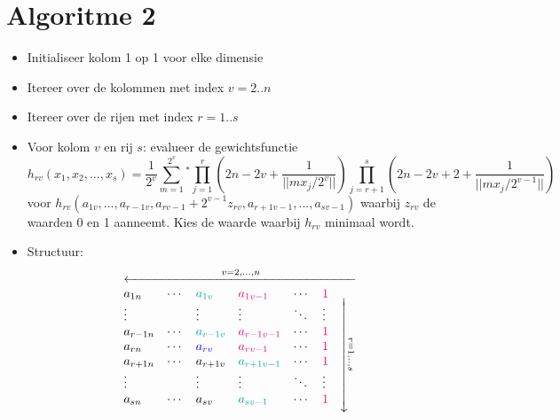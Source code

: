 \documentclass[a4paper, 12pt]{article}
\begin{document}
\section{Algoritme 2}
\begin{itemize}
\item Initialiseer kolom 1 op 1 voor elke dimensie
\item Itereer over de kolommen met index $v=2..n$ 
\item Itereer over de rijen met index $r = 1..s$
\item Voor kolom $v$ en rij $s$: evalueer de gewichtsfunctie 
\begin{equation}
h_{rv}(x_1,x_2,...,x_s)=\frac{1}{2^v}\sum_{m=1}^{2^v}{}^*\prod_{j=1}^r\left(2n-2v+\frac{1}{||mx_j/2^v||}\right)\prod_{j=r+1}^s\left(2n-2v+2+\frac{1}{||mx_j/2^{v-1}||}\right)
\end{equation}
voor $h_{rv}(a_{1v},...,a_{r-1v},a_{rv-1}+2^{v-1}z_{rv},a_{r+1v-1},...,a_{sv-1})$ waarbij $z_{rv}$ de waarden 0 en 1 aanneemt. Kies de waarde waarbij $h_{rv}$ minimaal wordt.
\item Structuur:
\begin{equation}
\begin{array}{lllllll}
\multicolumn{7}{c}{\xleftarrow{\mbox{\hspace{75pt}}v=2,...,n\mbox{\hspace{75pt}}}} \\
a_{1n} & \cdots & \mbox{\textcolor{Emerald}{$a_{1v}$}} & \mbox{\textcolor{RubineRed}{$a_{1v-1}$}} & \cdots & \mbox{\textcolor{RubineRed}{$1$}} & \multirow{7}{*}{\rotatebox{270}{$\xrightarrow{\mbox{\hspace{30pt}}r=1,..,s\mbox{\hspace{30pt}}}$}}\\
\vdots & & \vdots & \vdots & \ddots & \vdots & \\
a_{r-1n} & \cdots & \mbox{\textcolor{Emerald}{$a_{r-1v}$}} & \mbox{\textcolor{RubineRed}{$a_{r-1v-1}$}} & \cdots & 
\mbox{\textcolor{RubineRed}{$1$}} & \\
a_{rn} & \cdots & \mbox{\textcolor{Blue}{$a_{rv}$}} & \mbox{\textcolor{RubineRed}{$a_{rv-1}$}} & \cdots & 
\mbox{\textcolor{RubineRed}{$1$}} & \\
a_{r+1n} & \cdots & a_{r+1v} & \mbox{\textcolor{Emerald}{$a_{r+1v-1}$}} & \cdots & 
\mbox{\textcolor{RubineRed}{$1$}} & \\
\vdots & & \vdots & \vdots & \ddots & \vdots & \\
a_{sn} & \cdots & a_{sv}& \mbox{\textcolor{Emerald}{$a_{sv-1}$}} & \cdots &
\mbox{\textcolor{RubineRed}{$1$}} & \\
\end{array}
\end{equation}

\end{itemize}
\clearpage
\end{document}
